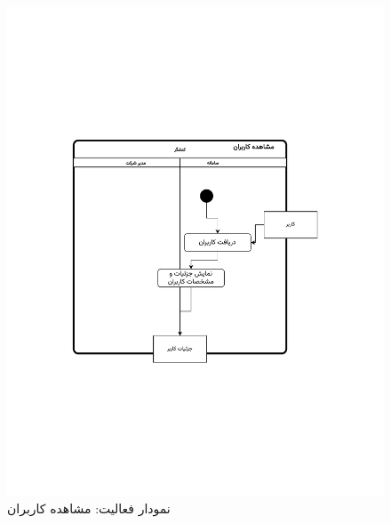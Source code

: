 \begin{figure}
	\centering
	\includegraphics[scale=0.8, page=1]{figs/OOD-activity-viewuser.pdf}
	\caption{نمودار فعالیت: مشاهده کاربران}
\end{figure}
\FloatBarrier
\newpage

